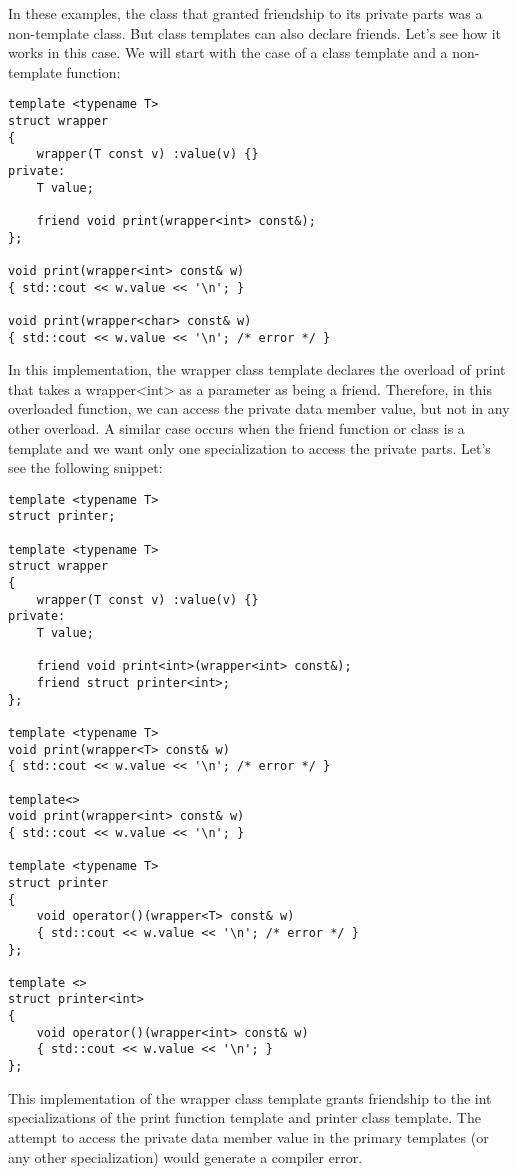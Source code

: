 In these examples, the class that granted friendship to its private parts was a non-template class. But class templates can also declare friends. Let’s see how it works in this case. We will start with the case of a class template and a non-template function:

\begin{lstlisting}[style=styleCXX]
template <typename T>
struct wrapper
{
	wrapper(T const v) :value(v) {}
private:
	T value;
	
	friend void print(wrapper<int> const&);
};

void print(wrapper<int> const& w)
{ std::cout << w.value << '\n'; }

void print(wrapper<char> const& w)
{ std::cout << w.value << '\n'; /* error */ }
\end{lstlisting}

In this implementation, the wrapper class template declares the overload of print that takes a wrapper<int> as a parameter as being a friend. Therefore, in this overloaded function, we can access the private data member value, but not in any other overload. A similar case occurs when the friend function or class is a template and we want only one specialization to access the private parts. Let’s see the following snippet:

\begin{lstlisting}[style=styleCXX]
template <typename T>
struct printer;

template <typename T>
struct wrapper
{
	wrapper(T const v) :value(v) {}
private:
	T value;
	
	friend void print<int>(wrapper<int> const&);
	friend struct printer<int>;
};

template <typename T>
void print(wrapper<T> const& w)
{ std::cout << w.value << '\n'; /* error */ }

template<>
void print(wrapper<int> const& w)
{ std::cout << w.value << '\n'; }

template <typename T>
struct printer
{
	void operator()(wrapper<T> const& w)
	{ std::cout << w.value << '\n'; /* error */ }
};

template <>
struct printer<int>
{
	void operator()(wrapper<int> const& w)
	{ std::cout << w.value << '\n'; }
};
\end{lstlisting}

This implementation of the wrapper class template grants friendship to the int specializations of the print function template and printer class template. The attempt to access the private data member value in the primary templates (or any other specialization) would generate a compiler error.

